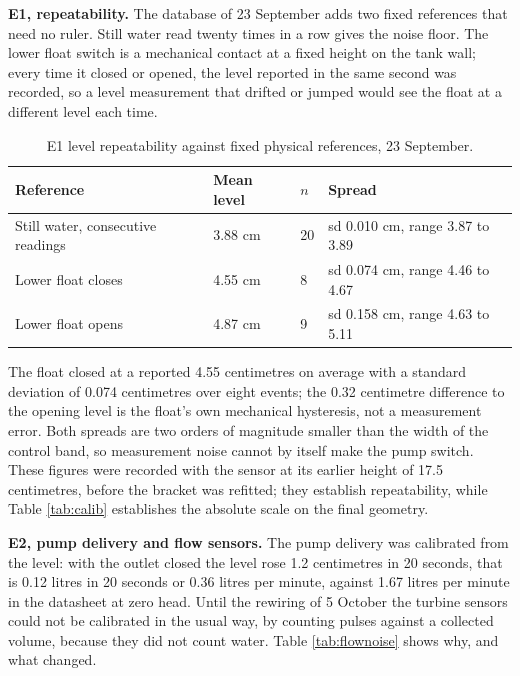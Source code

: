 \textbf{E1, repeatability.} The database of 23 September adds two fixed references that need no ruler. Still water read twenty times in a row gives the noise floor. The lower float switch is a mechanical contact at a fixed height on the tank wall; every time it closed or opened, the level reported in the same second was recorded, so a level measurement that drifted or jumped would see the float at a different level each time.

\begin{table}[H]
\caption{E1 level repeatability against fixed physical references, 23 September.}
\label{tab:repeat}
\centering
\renewcommand{\arraystretch}{1.05}
\begin{tabular}{|p{4.6cm}|p{2.6cm}|p{1.2cm}|p{4.2cm}|}
\hline
\textbf{Reference} & \textbf{Mean level} & \textbf{$n$} & \textbf{Spread} \\
\hline
Still water, consecutive readings & 3.88 cm & 20 & sd 0.010 cm, range 3.87 to 3.89 \\ \hline
Lower float closes & 4.55 cm & 8 & sd 0.074 cm, range 4.46 to 4.67 \\ \hline
Lower float opens & 4.87 cm & 9 & sd 0.158 cm, range 4.63 to 5.11 \\ \hline
\end{tabular}
\end{table}

The float closed at a reported 4.55 centimetres on average with a standard deviation of 0.074 centimetres over eight events; the 0.32 centimetre difference to the opening level is the float's own mechanical hysteresis, not a measurement error. Both spreads are two orders of magnitude smaller than the width of the control band, so measurement noise cannot by itself make the pump switch. These figures were recorded with the sensor at its earlier height of 17.5 centimetres, before the bracket was refitted; they establish repeatability, while Table \ref{tab:calib} establishes the absolute scale on the final geometry.

\textbf{E2, pump delivery and flow sensors.} The pump delivery was calibrated from the level: with the outlet closed the level rose 1.2 centimetres in 20 seconds, that is 0.12 litres in 20 seconds or 0.36 litres per minute, against 1.67 litres per minute in the datasheet at zero head. Until the rewiring of 5 October the turbine sensors could not be calibrated in the usual way, by counting pulses against a collected volume, because they did not count water. Table \ref{tab:flownoise} shows why, and what changed.

